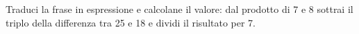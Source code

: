 \item Traduci la frase in espressione e calcolane il valore: dal prodotto di 7 e 8 sottrai il triplo della differenza tra 25 e 18 e dividi il risultato per 7.